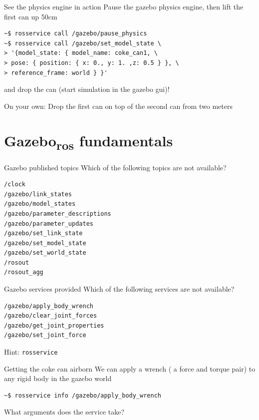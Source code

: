 \documentclass[presentation,aspectratio=1610]{beamer}
\begin{document}
\begin{frame}[label={sec:org1147631},fragile]{See the physics engine in action}
 Pause the gazebo physics engine, then lift the first can up 50cm
\begin{verbatim}
~$ rosservice call /gazebo/pause_physics
~$ rosservice call /gazebo/set_model_state \ 
> '{model_state: { model_name: coke_can1, \
> pose: { position: { x: 0., y: 1. ,z: 0.5 } }, \
> reference_frame: world } }'
\end{verbatim}

and drop the can (start simulation in the gazebo gui)!
\end{frame}

\begin{frame}[label={sec:org660c744}]{On your own: Drop the first can on top of the second can from two meters}
\end{frame}

\section{Gazebo\textsubscript{ros} fundamentals}
\label{sec:org8aa7a76}

\begin{frame}[label={sec:org3804781},fragile]{Gazebo published topics}
 Which of the following topics are \alert{not} available?

\begin{verbatim}
/clock
/gazebo/link_states
/gazebo/model_states
/gazebo/parameter_descriptions
/gazebo/parameter_updates
/gazebo/set_link_state
/gazebo/set_model_state
/gazebo/set_world_state
/rosout
/rosout_agg
\end{verbatim}
\end{frame}

\begin{frame}[label={sec:org3c56421},fragile]{Gazebo services provided}
 Which of the following services are \alert{not} available?
\begin{verbatim}
/gazebo/apply_body_wrench
/gazebo/clear_joint_forces
/gazebo/get_joint_properties
/gazebo/set_joint_force
\end{verbatim}

Hint: \texttt{rosservice}
\end{frame}

\begin{frame}[label={sec:org445ccf1},fragile]{Getting the coke can airborn}
 We can apply a \alert{wrench} ( a force and torque pair) to any rigid body in the gazebo world

\begin{verbatim}
~$ rosservice info /gazebo/apply_body_wrench
\end{verbatim}

What arguments does the service take?
\end{frame}
\end{document}
